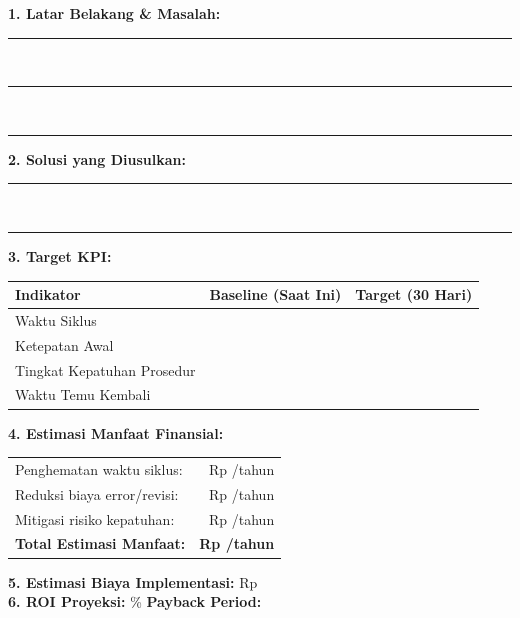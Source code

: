 \documentclass[12pt,a4paper]{report}
\newcommand{\fillline}[1][6cm]{\underline{\hspace{#1}}}
\newcommand{\writespace}[1][2cm]{\rule{0pt}{#1}}
\begin{document}
\begin{tcolorbox}[colback=plnblue!3, colframe=plnblue, sharp corners, title={\bfseries Business Case 1 Halaman}, boxrule=1pt]

\noindent\textbf{1. Latar Belakang \& Masalah:}\\
\rule{\textwidth}{0.3pt}\writespace[0.7cm]\\
\rule{\textwidth}{0.3pt}\writespace[0.7cm]\\
\rule{\textwidth}{0.3pt}\writespace[0.5cm]

\vspace{0.2cm}
\noindent\textbf{2. Solusi yang Diusulkan:}\\
\rule{\textwidth}{0.3pt}\writespace[0.7cm]\\
\rule{\textwidth}{0.3pt}\writespace[0.5cm]

\vspace{0.2cm}
\noindent\textbf{3. Target KPI:}

\vspace{0.2cm}
{\small
\renewcommand{\arraystretch}{1.8}
\begin{tabularx}{\textwidth}{@{} >{\raggedright\arraybackslash}X c c @{}}
\toprule
\textbf{Indikator} & \textbf{Baseline (Saat Ini)} & \textbf{Target (30 Hari)} \\
\midrule
Waktu Siklus & & \\
\hline
Ketepatan Awal & & \\
\hline
Tingkat Kepatuhan Prosedur & & \\
\hline
Waktu Temu Kembali & & \\
\bottomrule
\end{tabularx}
\renewcommand{\arraystretch}{1.0}
}

\vspace{0.3cm}
\noindent\textbf{4. Estimasi Manfaat Finansial:}\\[0.2cm]
\begin{tabularx}{\textwidth}{@{} X r @{}}
Penghematan waktu siklus: & Rp \fillline[4cm] /tahun \\[0.25cm]
Reduksi biaya error/revisi: & Rp \fillline[4cm] /tahun \\[0.25cm]
Mitigasi risiko kepatuhan: & Rp \fillline[4cm] /tahun \\[0.25cm]
\textbf{Total Estimasi Manfaat:} & \textbf{Rp \fillline[4cm] /tahun} \\
\end{tabularx}

\vspace{0.3cm}
\noindent\textbf{5. Estimasi Biaya Implementasi:} Rp \fillline[4cm]\\[0.2cm]
\noindent\textbf{6. ROI Proyeksi:} \fillline[3cm]\% \quad \textbf{Payback Period:} \fillline[3cm]

\end{tcolorbox}
\end{document}
